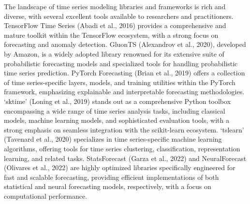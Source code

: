 \documentclass{article}
\begin{document}
The landscape of time series modeling libraries and frameworks is rich and diverse, with several excellent tools available to researchers and practitioners. TensorFlow Time Series (Abadi et al., 2016) provides a comprehensive and mature toolkit within the TensorFlow ecosystem, with a strong focus on forecasting and anomaly detection.  GluonTS (Alexandrov et al., 2020), developed by Amazon, is a widely adopted library renowned for its extensive suite of probabilistic forecasting models and specialized tools for handling probabilistic time series prediction.  PyTorch Forecasting (Brian et al., 2019) offers a collection of time series-specific layers, models, and training utilities within the PyTorch framework, emphasizing explainable and interpretable forecasting methodologies.  `sktime' (Loning et al., 2019) stands out as a comprehensive Python toolbox encompassing a wide range of time series analysis tasks, including classical models, machine learning models, and sophisticated evaluation tools, with a strong emphasis on seamless integration with the scikit-learn ecosystem.  `tslearn' (Tavenard et al., 2020) specializes in time series-specific machine learning algorithms, offering tools for time series clustering, classification, representation learning, and related tasks.  StatsForecast (Garza et al., 2022) and NeuralForecast (Olivares et al., 2022) are highly optimized libraries specifically engineered for fast and scalable forecasting, providing efficient implementations of both statistical and neural forecasting models, respectively, with a focus on computational performance.
\end{document}
